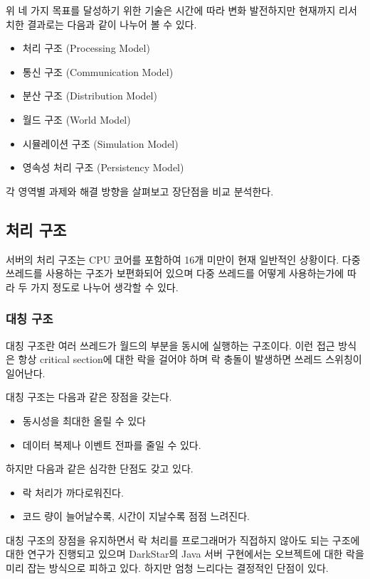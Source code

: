 \documentclass[chapter,kosection, 10.5pt, romanfixed, a4paper]{oblivoir}
\begin{document}
위 네 가지 목표를 달성하기 위한 기술은 시간에 따라 변화 발전하지만 현재까지 
리서치한 결과로는 다음과 같이 나누어 볼 수 있다. 

\begin{itemize}
\item 처리 구조 (Processing Model)
\item 통신 구조 (Communication Model)
\item 분산 구조 (Distribution Model)
\item 월드 구조 (World Model)
\item 시뮬레이션 구조 (Simulation Model)
\item 영속성 처리 구조 (Persistency Model)
\end{itemize}

각 영역별 과제와 해결 방향을 살펴보고 장단점을 비교 분석한다. 

\subsection{처리 구조}

서버의 처리 구조는 CPU 코어를 포함하여 16개 미만이 현재 일반적인 상황이다. 
다중 쓰레드를 사용하는 구조가 보편화되어 있으며 다중 쓰레드를 어떻게 
사용하는가에 따라 두 가지 정도로 나누어 생각할 수 있다. 

\subsubsection{대칭 구조}

대칭 구조란 여러 쓰레드가 월드의 부분을 동시에 실행하는 구조이다. 이런 접근 
방식은 항상 critical section에 대한 락을 걸어야 하며 락 충돌이 발생하면 
쓰레드 스위칭이 일어난다. 

대칭 구조는 다음과 같은 장점을 갖는다. 
\begin{itemize} 
\item 동시성을 최대한 올릴 수 있다
\item 데이터 복제나 이벤트 전파를 줄일 수 있다. 
\end{itemize}

하지만 다음과 같은 심각한 단점도 갖고 있다. 
\begin{itemize}
\item 락 처리가 까다로워진다. 
\item 코드 량이 늘어날수록, 시간이 지날수록 점점 느려진다.
\end{itemize}

대칭 구조의 장점을 유지하면서 락 처리를 프로그래머가 직접하지 않아도 
되는 구조에 대한 연구가 진행되고 있으며 DarkStar의 Java 서버 구현에서는
오브젝트에 대한 락을 미리 잡는 방식으로 피하고 있다. 하지만 엄청 느리다는
결정적인 단점이 있다. 
\end{document}

